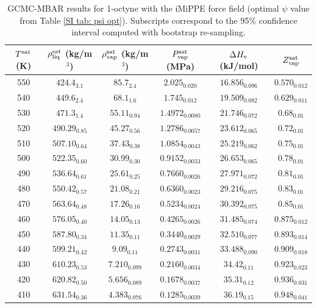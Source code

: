 \documentclass[journal=jctc,manuscript=article]{achemso}
\begin{document}
\begin{table}[htb!]
	\caption{GCMC-MBAR results for 1-octyne with the iMiPPE force field (optimal $\psi$ value from Table \ref{SI tab: psi opt}). Subscripts correspond to the 95\% confidence interval computed with bootstrap re-sampling.}
	\begin{center}
		\begin{tabular}{|c|c|c|c|c|c|}
			\hline
			$T^{\rm sat}$ (K) & $\rho_{\rm liq}^{\rm sat}$ (kg/m$^3$) & $\rho_{\rm vap}^{\rm sat}$ (kg/m$^3$) & $P_{\rm vap}^{\rm sat}$ (MPa) & $\Delta H_{\rm v}$ (kJ/mol) & $Z_{\rm vap}^{\rm sat}$ \\ \hline
			550 & $424.4_{3.1}$ & $85.7_{2.4}$ & $2.025_{0.020}$ & $16.856_{0.096}$ & $0.570_{0.012}$ \\
			540 & $449.6_{2.4}$ & $68.1_{1.6}$ & $1.745_{0.012}$ & $19.509_{0.082}$ & $0.629_{0.011}$ \\
			530 & $471.3_{1.4}$ & $55.11_{0.94}$ & $1.4972_{0.0080}$ & $21.746_{0.072}$ & $0.68_{0.01}$ \\
			520 & $490.29_{0.85}$ & $45.27_{0.56}$ & $1.2786_{0.0057}$ & $23.612_{0.065}$ & $0.72_{0.01}$ \\
			510 & $507.10_{0.64}$ & $37.43_{0.38}$ & $1.0854_{0.0043}$ & $25.219_{0.062}$ & $0.75_{0.01}$ \\
			500 & $522.35_{0.60}$ & $30.99_{0.30}$ & $0.9152_{0.0033}$ & $26.653_{0.065}$ & $0.78_{0.01}$ \\
			490 & $536.64_{0.61}$ & $25.61_{0.25}$ & $0.7660_{0.0026}$ & $27.971_{0.072}$ & $0.81_{0.01}$ \\
			480 & $550.42_{0.57}$ & $21.08_{0.21}$ & $0.6360_{0.0023}$ & $29.216_{0.075}$ & $0.83_{0.01}$ \\
			470 & $563.64_{0.48}$ & $17.26_{0.16}$ & $0.5234_{0.0024}$ & $30.392_{0.075}$ & $0.85_{0.01}$ \\
			460 & $576.05_{0.40}$ & $14.05_{0.13}$ & $0.4265_{0.0026}$ & $31.485_{0.074}$ & $0.875_{0.012}$ \\
			450 & $587.80_{0.34}$ & $11.35_{0.11}$ & $0.3440_{0.0029}$ & $32.510_{0.077}$ & $0.893_{0.014}$ \\
			440 & $599.21_{0.42}$ & $9.09_{0.11}$ & $0.2743_{0.0031}$ & $33.488_{0.090}$ & $0.909_{0.018}$ \\
			430 & $610.23_{0.53}$ & $7.210_{0.099}$ & $0.2160_{0.0034}$ & $34.42_{0.11}$ & $0.923_{0.023}$ \\
			420 & $620.82_{0.50}$ & $5.656_{0.089}$ & $0.1678_{0.0037}$ & $35.31_{0.12}$ & $0.936_{0.031}$ \\
			410 & $631.54_{0.36}$ & $4.383_{0.076}$ & $0.1285_{0.0039}$ & $36.19_{0.15}$ & $0.948_{0.041}$ \\
			\hline
		\end{tabular}
	\end{center}
\end{table}
\end{document}
